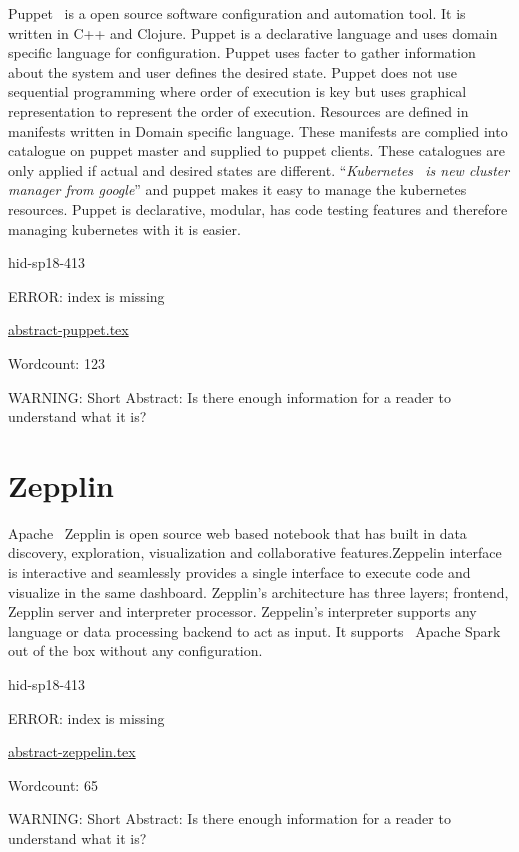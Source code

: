 Puppet~\cite{hid-sp18-413-puppet} is a open source software configuration and
automation tool. It is written in C++ and Clojure. Puppet is a declarative
language and uses domain specific language for configuration. Puppet uses facter
to gather information about the system and user defines the desired
state. Puppet does not use sequential programming where order of execution is
key but uses graphical representation to represent the order of
execution. Resources are defined in manifests written in Domain specific
language. These manifests are complied into catalogue on puppet master and
supplied to puppet clients. These catalogues are only applied if actual and
desired states are different. \color{blue}``\emph{Kubernetes~\cite{hid-sp18-413-Kubernetes} is
new cluster manager from google}''\color{black} and puppet makes it easy to manage the
kubernetes resources. Puppet is declarative, modular, has code testing features
and therefore managing kubernetes with it is easier.


\begin{IU}

hid-sp18-413

ERROR: index is missing

\href{https://github.com/cloudmesh-community/hid-sp18-413/blob/master//technology/abstract-puppet.tex}{abstract-puppet.tex}

 

Wordcount: 123

WARNING: Short Abstract: Is there enough information for a reader to understand what it is?

\end{IU}

\section{Zepplin}

Apache~\cite{hid-sp18-413-Zeppelin} Zepplin is open source web based notebook
that has built in data discovery, exploration, visualization and collaborative
features.Zeppelin interface is interactive and seamlessly provides a single
interface to execute code and visualize in the same dashboard. Zepplin’s
architecture has three layers; frontend, Zepplin server and interpreter
processor. Zeppelin’s interpreter supports any language or data processing
backend to act as input. It supports~\cite{hid-sp18-413-ApacheSpark} Apache
Spark out of the box without any configuration.


\begin{IU}

hid-sp18-413

ERROR: index is missing

\href{https://github.com/cloudmesh-community/hid-sp18-413/blob/master//technology/abstract-zeppelin.tex}{abstract-zeppelin.tex}

 

Wordcount: 65

WARNING: Short Abstract: Is there enough information for a reader to understand what it is?

\end{IU}

